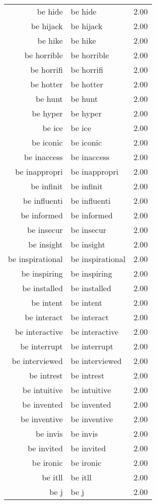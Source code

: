 \begin{table}[ht]
\begin{tabular}{rlr}
  be hide & be hide & 2.00 \\ 
  be hijack & be hijack & 2.00 \\ 
  be hike & be hike & 2.00 \\ 
  be horrible & be horrible & 2.00 \\ 
  be horrifi & be horrifi & 2.00 \\ 
  be hotter & be hotter & 2.00 \\ 
  be hunt & be hunt & 2.00 \\ 
  be hyper & be hyper & 2.00 \\ 
  be ice & be ice & 2.00 \\ 
  be iconic & be iconic & 2.00 \\ 
  be inaccess & be inaccess & 2.00 \\ 
  be inappropri & be inappropri & 2.00 \\ 
  be infinit & be infinit & 2.00 \\ 
  be influenti & be influenti & 2.00 \\ 
  be informed & be informed & 2.00 \\ 
  be insecur & be insecur & 2.00 \\ 
  be insight & be insight & 2.00 \\ 
  be inspirational & be inspirational & 2.00 \\ 
  be inspiring & be inspiring & 2.00 \\ 
  be installed & be installed & 2.00 \\ 
  be intent & be intent & 2.00 \\ 
  be interact & be interact & 2.00 \\ 
  be interactive & be interactive & 2.00 \\ 
  be interrupt & be interrupt & 2.00 \\ 
  be interviewed & be interviewed & 2.00 \\ 
  be intrest & be intrest & 2.00 \\ 
  be intuitive & be intuitive & 2.00 \\ 
  be invented & be invented & 2.00 \\ 
  be inventive & be inventive & 2.00 \\ 
  be invis & be invis & 2.00 \\ 
  be invited & be invited & 2.00 \\ 
  be ironic & be ironic & 2.00 \\ 
  be itll & be itll & 2.00 \\ 
  be j & be j & 2.00 \\ 

\end{tabular}
\end{table}
